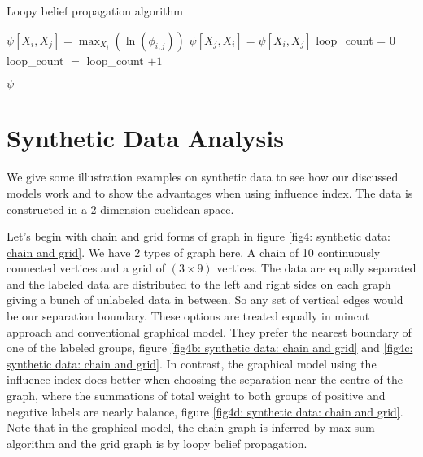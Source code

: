 \begin{algorithm}[H]
	\caption{Loopy belief propagation algorithm}
	\begin{algorithmic}[1]
		\State $\psi[X_i, X_j] = \max_{X_i}{\left( \ln{(\phi_{i,j})} \right)}$
		\State $\psi[X_j, X_i] = \psi[X_i, X_j]$
		\EndFor
		\State loop\_count = 0
			\EndFor
		\State loop\_count $=$ loop\_count $+ 1$
		\EndWhile
		
		\RETURN $\psi$
		
		\EndFunction
	\end{algorithmic}
	\label{alg4: loopy belief}
\end{algorithm}

\section{Synthetic Data Analysis}

We give some illustration examples on synthetic data to see how our discussed models work and to show the advantages when using influence index. The data is constructed in a 2-dimension euclidean space.

Let's begin with chain and grid forms of graph in figure \ref{fig4: synthetic data: chain and grid}. We have 2 types of graph here. A chain of 10 continuously connected vertices and a grid of $(3\times 9)$ vertices. The data are equally separated and the labeled data are distributed to the left and right sides on each graph giving a bunch of unlabeled data in between. So any set of vertical edges would be our separation boundary. These options are treated equally in mincut approach and conventional graphical model. They prefer the nearest boundary of one of the labeled groups, figure \ref{fig4b: synthetic data: chain and grid} and \ref{fig4c: synthetic data: chain and grid}. In contrast, the graphical model using the influence index does better when choosing the separation near the centre of the graph, where the summations of total weight to both groups of positive and negative labels are nearly balance, figure \ref{fig4d: synthetic data: chain and grid}. Note that in the graphical model, the chain graph is inferred by max-sum algorithm and the grid graph is by loopy belief propagation.

